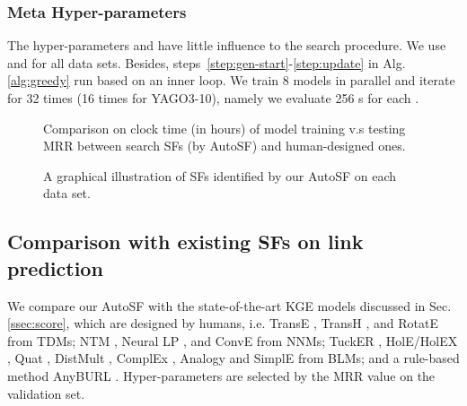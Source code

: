 \documentclass[conference]{IEEEtran}
\begin{document}
\subsubsection{Meta Hyper-parameters}
The hyper-parameters
 and  have little influence to the search procedure. 
We use  and  for all data sets.
Besides, steps~\ref{step:gen-start}-\ref{step:update} in Alg.\ref{alg:greedy} run based on an inner loop. 
We train 8 models in parallel and iterate for 32 times (16 times for YAGO3-10),
namely we evaluate 256 s for each .

\begin{figure*}[ht]
	\centering
	\vspace{-6px}
	\caption{Comparison on clock time (in hours) of model training
		v.s testing MRR 
		between search SFs (by AutoSF) and 
		human-designed ones.}
	\label{fig:curve}
		\vspace{-5px}
\end{figure*}

\begin{figure*}[ht]
	\centering
	\quad
	\quad
	\quad
	\quad
	\vspace{-6px}
	\caption{A graphical illustration of SFs identified by our AutoSF on each data set.}
	\label{fig:searchedsf}
	\vspace{-12px}
\end{figure*}

\subsection{Comparison with existing SFs on link prediction}
\label{ssec:compstat}

We compare our AutoSF with the state-of-the-art KGE models
discussed in Sec.\ref{ssec:score},
which are designed by humans,
i.e. 
TransE \cite{bordes2013translating},
TransH \cite{wang2014knowledge},
and
RotatE \cite{sun2019rotate}
from TDMs;
NTM \cite{socher2013reasoning},
Neural LP \cite{yang2017differentiable},
and 
ConvE \cite{dettmers2017convolutional}
from NNMs;
{
TuckER \cite{balavzevic2019tucker},
HolE/HolEX \cite{nickel2016holographic,xue2018expanding}, 
Quat \cite{zhang2019quaternion},
DistMult \cite{yang2014embedding},
ComplEx \cite{trouillon2017knowledge},
Analogy \cite{liu2017analogical}
and
SimplE \cite{kazemi2018simple}
from BLMs;
and a rule-based method AnyBURL \cite{meilicke2019anytime}.
}
Hyper-parameters are selected by the MRR value on the validation set.
\end{document}
